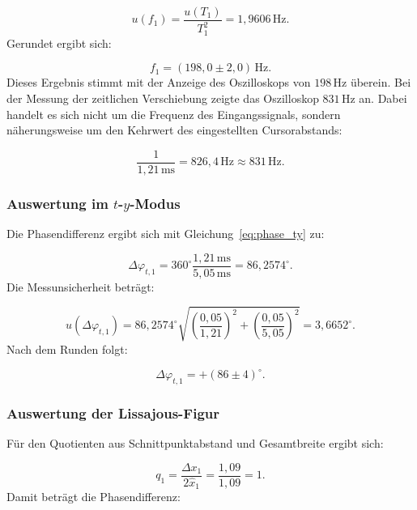 \documentclass{report}
\begin{document}
\begin{equation}
u(f_1)
=
\frac{u(T_1)}{T_1^2}
=
1{,}9606\,\mathrm{Hz}.
\end{equation}
\noindent
Gerundet ergibt sich:

\begin{equation}
\boxed{f_1=(198{,}0\pm2{,}0)\,\mathrm{Hz}}.
\end{equation}
\noindent
Dieses Ergebnis stimmt mit der Anzeige des Oszilloskops von $198\,\mathrm{Hz}$ überein.
\noindent
Bei der Messung der zeitlichen Verschiebung zeigte das Oszilloskop $831\,\mathrm{Hz}$ an. Dabei handelt es sich nicht um die Frequenz des Eingangssignals, sondern näherungsweise um den Kehrwert des eingestellten Cursorabstands:

\begin{equation}
\frac{1}{1{,}21\,\mathrm{ms}}
=
826{,}4\,\mathrm{Hz}
\approx831\,\mathrm{Hz}.
\end{equation}

\subsubsection{Auswertung im $t$-$y$-Modus}
\noindent
Die Phasendifferenz ergibt sich mit Gleichung~\eqref{eq:phase_ty} zu:

\begin{equation}
\Delta\varphi_{t,1}
=
360^\circ
\frac{1{,}21\,\mathrm{ms}}{5{,}05\,\mathrm{ms}}
=
86{,}2574^\circ.
\end{equation}
\noindent
Die Messunsicherheit beträgt:

\begin{equation}
u(\Delta\varphi_{t,1})
=
86{,}2574^\circ
\sqrt{
\left(\frac{0{,}05}{1{,}21}\right)^2
+
\left(\frac{0{,}05}{5{,}05}\right)^2
}
=
3{,}6652^\circ.
\end{equation}
\noindent
Nach dem Runden folgt:

\begin{equation}
\boxed{\Delta\varphi_{t,1}=+(86\pm4)^\circ}.
\label{eq:result_ty_1}
\end{equation}

\subsubsection{Auswertung der Lissajous-Figur}
\noindent
Für den Quotienten aus Schnittpunktabstand und Gesamtbreite ergibt sich:

\begin{equation}
q_1
=
\frac{\Delta x_1}{2\hat{x}_1}
=
\frac{1{,}09}{1{,}09}
=
1.
\end{equation}
\noindent
Damit beträgt die Phasendifferenz:
\end{document}
